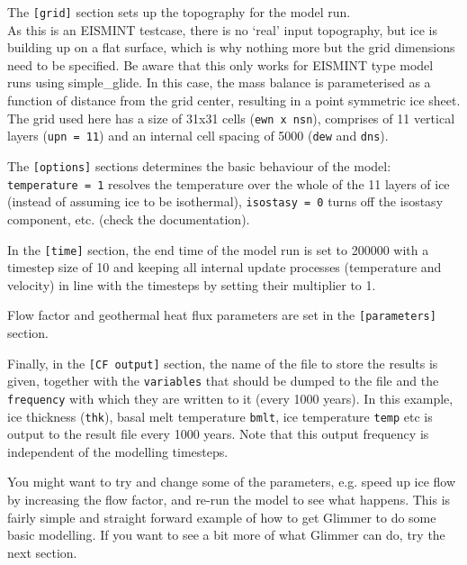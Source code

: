 The \texttt{[grid]} section sets up the topography for the model run.\\
As this is an EISMINT testcase, there is no `real' input topography, but ice is building up on a
flat surface, which is why nothing more but the grid dimensions need to be specified. Be aware that
this only works for EISMINT type model runs using simple\_glide.
In this case, the mass balance is parameterised as a function of distance
from the grid center, resulting in a point symmetric ice sheet.
The grid used here has a size of 31x31 cells (\texttt{ewn x
nsn}), comprises of 11 vertical layers (\texttt{upn = 11}) and an internal cell spacing of
5000 (\texttt{dew} and \texttt{dns}).

The \texttt{[options]} sections determines the basic behaviour of the model:\\
\texttt{temperature = 1} resolves the temperature over the whole of the 11
layers of ice (instead of assuming ice to be isothermal), \texttt{isostasy = 0}
turns off the isostasy component, etc. (check the documentation).

In the \texttt{[time]} section, the end time of the model run is set to 200000
with a timestep size of 10 and keeping all internal update processes
(temperature and velocity) in line with the timesteps by setting their
multiplier to 1.

Flow factor and geothermal heat flux parameters are set in the
\texttt{[parameters]} section.

Finally, in the \texttt{[CF output]} section, the name of the file to store the results
is given, together with the \texttt{variables} that should be dumped to the file and the
\texttt{frequency} with which they are written to it (every 1000 years). In this example, 
ice thickness (\texttt{thk}), basal melt temperature \texttt{bmlt}, ice temperature \texttt{temp} etc 
is output to the result file every 1000 years. Note that this output frequency is independent of the
modelling timesteps.

You might want to try and change some of the parameters, e.g. speed up ice flow by 
increasing the flow factor, and re-run the model to see what happens.
This is fairly simple and straight forward example of how to get Glimmer to do some 
basic modelling. If you want to see a bit more of what Glimmer can do, try the next section.
